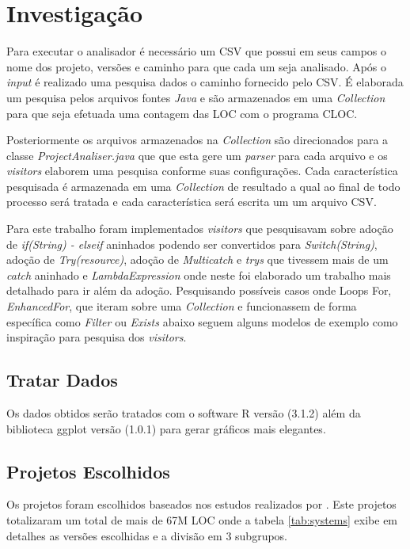 \chapter{Investigação}
Para executar o analisador é necessário um \acs{CSV} que possui em seus campos o nome dos projeto, versões e caminho para que cada um seja analisado. Após o {\it input} é realizado uma pesquisa dados o caminho fornecido pelo \acs{CSV}.
É elaborada um pesquisa pelos arquivos fontes \textit{Java} e são armazenados em uma \textit{Collection} para que seja efetuada uma contagem das \acs{LOC} com o programa \acs{CLOC}.

Posteriormente os arquivos armazenados na \textit{Collection} são direcionados para a classe \textit{ProjectAnaliser.java} que que esta gere um \textit{parser} para cada arquivo e os \textit{visitors} elaborem uma pesquisa conforme suas configurações. Cada característica pesquisada é armazenada em uma \textit{Collection} de resultado a qual ao final de todo processo será tratada e cada característica será escrita um um arquivo \acs{CSV}.

Para este trabalho foram implementados \textit{visitors} que pesquisavam sobre adoção de \textit{if(String) - elseif} aninhados podendo ser convertidos para \textit{Switch(String)},  adoção de \textit{Try(resource)},  adoção de \textit{Multicatch} e \textit{trys} que tivessem mais de um \textit{catch} aninhado e \textit{LambdaExpression} onde neste foi elaborado um trabalho mais detalhado para ir além da adoção. Pesquisando possíveis casos onde Loops For, \textit{EnhancedFor}, que iteram sobre uma \textit{Collection} e funcionassem de forma específica como \textit{Filter} ou \textit{Exists} abaixo seguem alguns modelos de exemplo como inspiração para pesquisa dos \textit{visitors}.




\section{Tratar Dados}
Os dados obtidos serão tratados com o software R \cite{R} versão (3.1.2) além da biblioteca ggplot \cite{ggplot} versão (1.0.1) para gerar gráficos mais elegantes.


\section{Projetos Escolhidos}
Os projetos foram escolhidos baseados nos estudos realizados por \cite{Parnin:ACM2011, Dyer:ACM2014}. Este projetos totalizaram um total de mais de 67M \acs{LOC} onde a tabela \ref{tab:systems} exibe em detalhes as versões escolhidas e a divisão em 3 subgrupos.


